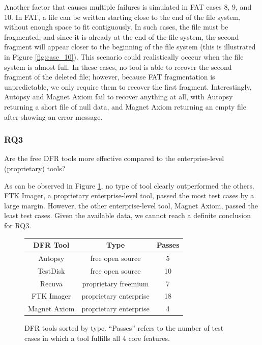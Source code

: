 Another factor that causes multiple failures is simulated in FAT cases 8, 9, and 10.
In FAT, a file can be written starting close to the end of the file system, without enough space to fit contiguously.
In such cases, the file must be fragmented, and since it is already at the end of the file system, the second fragment will appear closer to the beginning of the file system (this is illustrated in Figure \ref{fig:case_10}).
This scenario could realistically occcur when the file system is almost full.
In these cases, no tool is able to recover the second fragment of the deleted file; however, because FAT fragmentation is unpredictable, we only require them to recover the first fragment.
Interestingly, Autopsy and Magnet Axiom fail to recover anything at all, with Autopsy returning a short file of null data, and Magnet Axiom returning an empty file after showing an error message.

\subsubsection{RQ3}
Are the free DFR tools more effective compared to the enterprise-level (proprietary) tools?

As can be observed in Figure \ref{fig:results_table}, no type of tool clearly outperformed the others.
FTK Imager, a proprietary enterprise-level tool, passed the most test cases by a large margin.
However, the other enterprise-level tool, Magnet Axiom, passed the least test cases.
Given the available data, we cannot reach a definite conclusion for RQ3.

\begin{figure}[h]
    \begin{tabular}{| c | c | c |}
    \hline
    \textbf{DFR Tool} &  \textbf{Type} &  \textbf{Passes} \\ \hline
    Autopsy & free open source & 5 \\ \hline
    TestDisk & free open source & 10 \\ \hline
    Recuva & proprietary freemium & 7 \\ \hline
    FTK Imager & proprietary enterprise & 18 \\ \hline
    Magnet Axiom & proprietary enterprise & 4 \\ \hline
    \end{tabular}
    
    \caption{DFR tools sorted by type. ``Passes'' refers to the number of test cases in which a tool fulfills all 4 core features.}
    \label{fig:results_table}
\end{figure}

